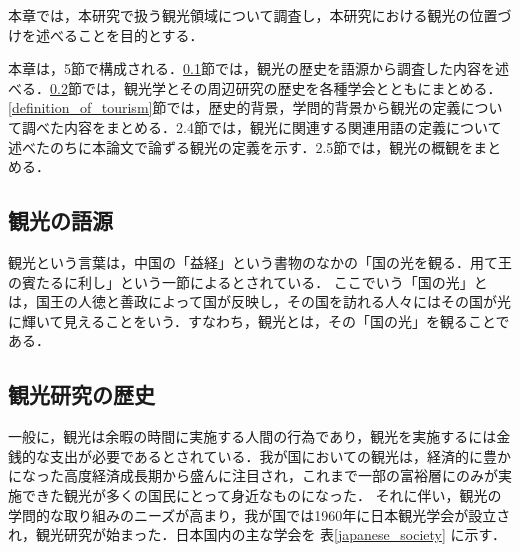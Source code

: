 \documentclass{jsarticle}
\begin{document}
本章では，本研究で扱う観光領域について調査し，本研究における観光の位置づけを述べることを目的とする．

本章は，5節で構成される．\ref{history_of_tourism}節では，観光の歴史を語源から調査した内容を述べる．\ref{history_of_tourism_study}節では，観光学とその周辺研究の歴史を各種学会とともにまとめる．\ref{definition_of_tourism}節では，歴史的背景，学問的背景から観光の定義について調べた内容をまとめる．2.4節では，観光に関連する関連用語の定義について述べたのちに本論文で論ずる観光の定義を示す．2.5節では，観光の概観をまとめる．

\newpage

\subsection{観光の語源}

\label{history_of_tourism}

観光という言葉は，中国の「益経」という書物のなかの「国の光を観る．用て王の賓たるに利し」という一節によるとされている．\cite{kanko_define}
ここでいう「国の光」とは，国王の人徳と善政によって国が反映し，その国を訪れる人々にはその国が光に輝いて見えることをいう．すなわち，観光とは，その「国の光」を観ることである．

\subsection{観光研究の歴史}

\label{history_of_tourism_study}

一般に，観光は余暇の時間に実施する人間の行為であり，観光を実施するには金銭的な支出が必要であるとされている．我が国においての観光は，経済的に豊かになった高度経済成長期から盛んに注目され，これまで一部の富裕層にのみが実施できた観光が多くの国民にとって身近なものになった．
それに伴い，観光の学問的な取り組みのニーズが高まり，我が国では1960年に日本観光学会が設立され，観光研究が始まった．日本国内の主な学会を 表\ref{japanese_society} に示す．
\end{document}
